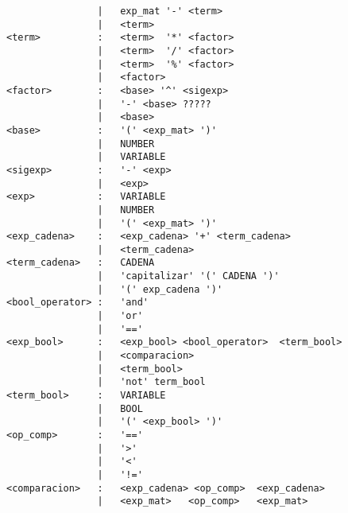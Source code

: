 \begin{verbatim}
                |   exp_mat '-' <term>
                |   <term>
<term>          :   <term>  '*' <factor>
                |   <term>  '/' <factor>
                |   <term>  '%' <factor>
                |   <factor>
<factor>        :   <base> '^' <sigexp>
                |   '-' <base> ?????
                |   <base>
<base>          :   '(' <exp_mat> ')'
                |   NUMBER
                |   VARIABLE
<sigexp>        :   '-' <exp>
                |   <exp>
<exp>           :   VARIABLE
                |   NUMBER
                |   '(' <exp_mat> ')'
<exp_cadena>    :   <exp_cadena> '+' <term_cadena>
                |   <term_cadena> 
<term_cadena>   :   CADENA
                |   'capitalizar' '(' CADENA ')'
                |   '(' exp_cadena ')'
<bool_operator> :   'and'
                |   'or'
                |   '=='
<exp_bool>      :   <exp_bool> <bool_operator>  <term_bool>
                |   <comparacion>
                |   <term_bool>
                |   'not' term_bool
<term_bool>     :   VARIABLE
                |   BOOL
                |   '(' <exp_bool> ')'
<op_comp>       :   '=='
                |   '>'
                |   '<'
                |   '!='
<comparacion>   :   <exp_cadena> <op_comp>  <exp_cadena>
                |   <exp_mat>   <op_comp>   <exp_mat>

    
\end{verbatim}
